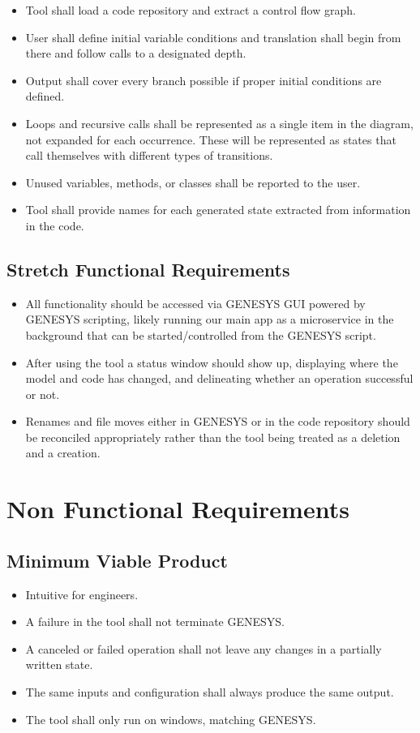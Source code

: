 \begin{itemize}
  \item Tool shall load a code repository and extract a control flow graph.
  \item User shall define initial variable conditions and translation shall begin from there and follow calls to a designated depth.
  \item Output shall cover every branch possible if proper initial conditions are defined.
  \item Loops and recursive calls shall be represented as a single item in the diagram, not expanded for each occurrence. These will be represented as states that call themselves with different types of transitions.
  \item Unused variables, methods, or classes shall be reported to the user.
  \item Tool shall provide names for each generated state extracted from information in the code.
\end{itemize}

\subsection{Stretch Functional Requirements}

\begin{itemize}
  \item All functionality should be accessed via GENESYS GUI powered by GENESYS scripting, likely running our main app as a microservice in the background that can be started/controlled from the GENESYS script. 
  \item After using the tool a status window should show up, displaying where the model and code has changed, and delineating whether an operation successful or not.
  \item Renames and file moves either in GENESYS or in the code repository should be reconciled appropriately rather than the tool being treated as a deletion and a creation.
\end{itemize}


\section{Non Functional Requirements}
\subsection{Minimum Viable Product}

\begin{itemize}
  \item Intuitive for engineers.
  \item A failure in the tool shall not terminate GENESYS.
  \item A canceled or failed operation shall not leave any changes in a partially written state.
  \item The same inputs and configuration shall always produce the same output. 
  \item The tool shall only run on windows, matching GENESYS. 
\end{itemize}


